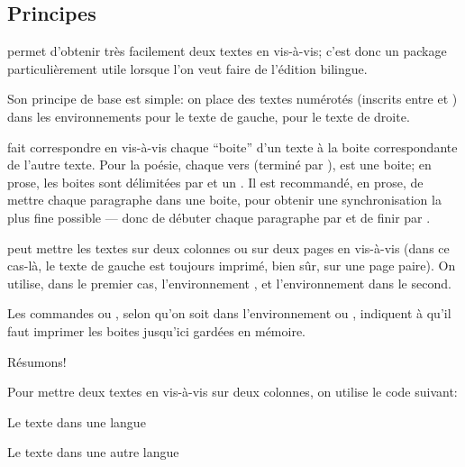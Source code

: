 \subsection{Principes}

 permet d'obtenir très facilement deux textes en vis-à-vis; c'est donc un package particulièrement utile lorsque l'on veut faire de l'édition bilingue.

Son principe de base est simple: on place des textes numérotés (inscrits entre  et ) dans les environnements  pour le texte de gauche,   pour le texte de droite.

 fait correspondre en vis-à-vis chaque \enquote{boite} d'un texte à la boite correspondante de l'autre texte. Pour la poésie,  chaque vers  (terminé par \ampersand ), est une boite;  en prose, les boites sont délimitées par   et un .  Il est recommandé, en prose, de mettre chaque paragraphe dans une boite, pour obtenir une synchronisation la plus fine possible --- donc de débuter chaque paragraphe par  et de finir par . 


 peut mettre les textes sur deux colonnes ou sur deux pages en vis-à-vis (dans ce cas-là, le texte de gauche est toujours imprimé, bien sûr, sur une page paire).
On utilise, dans le premier cas, l'environnement , et l'environnement  dans le second.

Les commandes  ou , selon qu'on soit dans l'environnement  ou , indiquent à \latex qu'il faut imprimer les boites jusqu'ici gardées en mémoire. 



\bigbreak

Résumons!

Pour mettre deux textes en vis-à-vis sur deux colonnes, on utilise le code suivant: 

\begin{latexcode}

\begin{pages}  %
\begin{Leftside} %
 \beginnumbering %
 \pstart %
 
Le texte dans une langue 
 
 \pend
 \endnumbering  %
 \end{Leftside} %
 
 \begin{Rightside}  %
 \beginnumbering
 \pstart
 
 Le texte dans une autre langue
 
 \pend
 \endnumbering
 \end{Rightside} 
 \Pages

  \end{pages} %
\end{latexcode}


